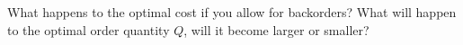 \begin{exercise}
  What happens to the optimal cost if you allow for backorders?  What
  will happen to the optimal order quantity $Q$, will it become larger or smaller? 

\end{exercise}
